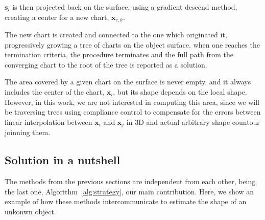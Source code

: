 $\mathbf{s}_i$ is then projected back on the surface, using a gradient descend method,
creating a center for a new chart, $\mathbf{x}_{c,k}$.

The new chart is created and connected to the one which originated it, progressively
growing a tree of charts on the object surface.
when one reaches the termination criteria, the procedure terminates and the full
path from the converging chart to the root of the tree is reported as a solution.

The area covered by a given chart on the surface is never empty, and
it always includes the center of the chart, $\mathbf{x}_{i}$, but its shape 
depends on the local shape. However, in this work, we are not interested in computing this area, 
since we will be traversing trees using compliance control to compensate for the errors between 
linear interpolation between $\mathbf{x}_i$ and $\mathbf{x}_j$ in 3D and actual arbitrary 
shape countour joinning them.

\subsection{Solution in a nutshell}
\label{sec:summary}

The methods from the previous sections are independent from each other, being the last one, Algorithm~\ref{alg:strategy}, our main contribution. Here, we show an example of how these methods intercommunicate to estimate the shape of an unkonwn object.

